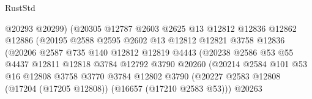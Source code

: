 \begin{lexlean}{RustStd}
\begin{coremodule}
                                    @20293
                                    @20299)
                                  (@20305
                                    @12787
                                    @2603
                                    @2625
                                    @13
                                    @12812
                                    @12836
                                    @12862
                                    @12886
                                    (@20195
                                      @2588
                                      @2595
                                      @2602
                                      @13
                                      @12812
                                      @12821
                                      @3758
                                      @12836
                                      (@20206
                                        @2587
                                        @735
                                        @140
                                        @12812
                                        @12819
                                        @4443
                                        (@20238
                                          @2586
                                          @53
                                          @55
                                          @4437
                                          @12811
                                          @12818
                                          @3784
                                          @12792
                                          @3790
                                          @20260
                                          (@20214
                                            @2584
                                            @101
                                            @53
                                            @16
                                            @12808
                                            @3758
                                            @3770
                                            @3784
                                            @12802
                                            @3790
                                            (@20227
                                              @2583
                                              @12808
                                              (@17204 (@17205 @12808))
                                              (@16657 (@17210 @2583 @53)))
                                            @20263

\end{coremodule}
\end{lexlean}

